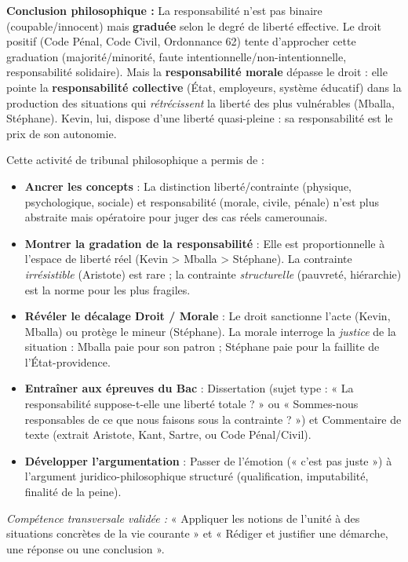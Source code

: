 \documentclass[11pt]{article}
\begin{document}
\begin{exoresolu}
\noindent\textbf{Conclusion philosophique :} La responsabilité n'est pas binaire (coupable/innocent) mais \textbf{graduée} selon le degré de liberté effective. Le droit positif (Code Pénal, Code Civil, Ordonnance 62) tente d'approcher cette graduation (majorité/minorité, faute intentionnelle/non-intentionnelle, responsabilité solidaire). Mais la \textbf{responsabilité morale} dépasse le droit : elle pointe la \textbf{responsabilité collective} (État, employeurs, système éducatif) dans la production des situations qui \textit{rétrécissent} la liberté des plus vulnérables (Mballa, Stéphane). Kevin, lui, dispose d'une liberté quasi-pleine : sa responsabilité est le prix de son autonomie.

\end{exoresolu}

\begin{aretenir}
Cette activité de tribunal philosophique a permis de :
\begin{itemize}
    \item \textbf{Ancrer les concepts} : La distinction liberté/contrainte (physique, psychologique, sociale) et responsabilité (morale, civile, pénale) n'est plus abstraite mais opératoire pour juger des cas réels camerounais.
    \item \textbf{Montrer la gradation de la responsabilité} : Elle est proportionnelle à l'espace de liberté réel (Kevin > Mballa > Stéphane). La contrainte \textit{irrésistible} (Aristote) est rare ; la contrainte \textit{structurelle} (pauvreté, hiérarchie) est la norme pour les plus fragiles.
    \item \textbf{Révéler le décalage Droit / Morale} : Le droit sanctionne l'acte (Kevin, Mballa) ou protège le mineur (Stéphane). La morale interroge la \textit{justice} de la situation : Mballa paie pour son patron ; Stéphane paie pour la faillite de l'État-providence.
    \item \textbf{Entraîner aux épreuves du Bac} : Dissertation (sujet type : « La responsabilité suppose-t-elle une liberté totale ? » ou « Sommes-nous responsables de ce que nous faisons sous la contrainte ? ») et Commentaire de texte (extrait Aristote, Kant, Sartre, ou Code Pénal/Civil).
    \item \textbf{Développer l'argumentation} : Passer de l'émotion (« c'est pas juste ») à l'argument juridico-philosophique structuré (qualification, imputabilité, finalité de la peine).
\end{itemize}
\emph{Compétence transversale validée :} « Appliquer les notions de l'unité à des situations concrètes de la vie courante » et « Rédiger et justifier une démarche, une réponse ou une conclusion ».
\end{aretenir}
\end{document}
